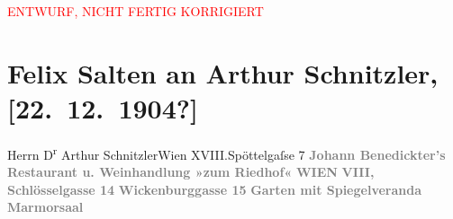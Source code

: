 
\begin{center}
            \textcolor{red}{ENTWURF, NICHT FERTIG KORRIGIERT}
                      \end{center}
            
         
         \renewcommand{\erwaehntePersonen}{Personen: Johann Benedickter, Anna Katharina Rehmann, Ottilie Salten}
         \renewcommand{\erwaehnteOrte}{Orte: Edmund-Weiß-Gasse, Riedhof, Schlösselgasse, Wickenburggasse, Wien, XVIII., Währing}
         \renewcommand{\erwaehnteWerke}{Werke: Symphonie Nr. 3 D-Moll}
               \section[Felix Salten an Arthur Schnitzler, {[}22. 12. 1904?{]}]{ Felix Salten an Arthur Schnitzler, {[}22. 12. 1904?{]}}\nopagebreak{}\rehead{ }\begin{ledgroupsized}[t]{13cm}\normalsize\beginnumbering \toendnotes[C]{\smallbreak\pagebreak[2]} 
\toendnotes[C]{\smallbreak}\pstart{}{\pb}Herrn D\textsuperscript{r} Arthur Schnitzler\pend{}\pstart{}Wien XVIII.\pend{}\pstart{}Spöttelgaſse 7\pend{}{\bigskip}\pstart
           \noindent{}\centering{}{\pb}\textcolor{gray}{\textbf{Johann Benedickter’s}}\pend
           \pstart
           \noindent{}\centering{}\textcolor{gray}{\textbf{Restaurant u. Weinhandlung »zum Riedhof«}}\pend
           \pstart
           \noindent{}\centering{}\textcolor{gray}{\textbf{WIEN}}\pend
           \pstart
           \noindent{}\centering{}\textcolor{gray}{\textbf{VIII, Schlösselgasse 14}}\pend
           \pstart
           \noindent{}\centering{}\textcolor{gray}{\textbf{Wickenburggasse 15 }}\pend
           \pstart
           \noindent{}\centering{}\textcolor{gray}{\textbf{Garten mit Spiegelveranda}}\pend
           \pstart
           \noindent{}\centering{}\textcolor{gray}{\textbf{Marmorsaal}}\pend

\end{ledgroupsized}
